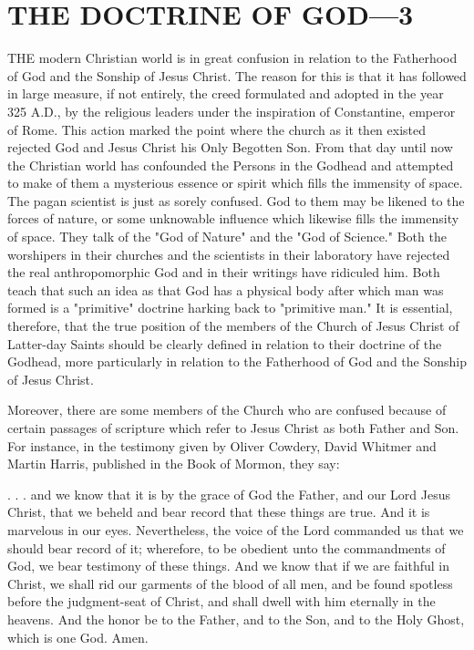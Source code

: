 \chapter{THE DOCTRINE OF GOD—3}

THE modern Christian world is in great confusion in relation to the Fatherhood of God and
the Sonship of Jesus Christ. The reason for this is that it has followed in large measure, if not
entirely, the creed formulated and adopted in the year 325 A.D., by the religious leaders
under the inspiration of Constantine, emperor of Rome. This action marked the point where
the church as it then existed rejected God and Jesus Christ his Only Begotten Son. From that
day until now the Christian world has confounded the Persons in the Godhead and attempted
to make of them a mysterious essence or spirit which fills the immensity of space. The pagan
scientist is just as sorely confused. God to them may be likened to the forces of nature, or
some unknowable influence which likewise fills the immensity of space. They talk of the
"God of Nature" and the "God of Science." Both the worshipers in their churches and the
scientists in their laboratory have rejected the real anthropomorphic God and in their writings
have ridiculed him. Both teach that such an idea as that God has a physical body after which
man was formed is a "primitive" doctrine harking back to "primitive man." It is essential,
therefore, that the true position of the members of the Church of Jesus Christ of Latter-day
Saints should be clearly defined in relation to their doctrine of the Godhead, more
particularly in relation to the Fatherhood of God and the Sonship of Jesus Christ.

Moreover, there are some members of the Church who are confused because of certain
passages of scripture which refer to Jesus Christ as both Father and Son. For instance, in the
testimony given by Oliver Cowdery, David Whitmer and Martin Harris, published in the
Book of Mormon, they say:

. . . and we know that it is by the grace of God the Father, and our Lord Jesus Christ, that we
beheld and bear record that these things are true. And it is marvelous in our eyes.
Nevertheless, the voice of the Lord commanded us that we should bear record of it;
wherefore, to be obedient unto the commandments of God, we bear testimony of these
things. And we know that if we are faithful in Christ, we shall rid our garments of the blood
of all men, and be found spotless before the judgment-seat of Christ, and shall dwell with
him eternally in the heavens. And the honor be to the Father, and to the Son, and to the Holy
Ghost, which is one God. Amen.

